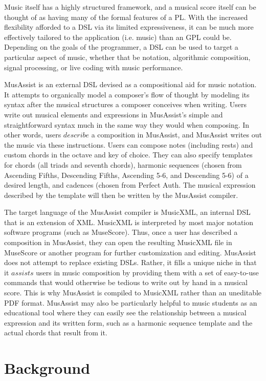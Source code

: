 \documentclass{report}
\begin{document}
Music itself has a highly structured framework, and a musical score itself can be thought of as having many of the formal features of a PL. With the increased flexibility afforded to  a DSL via its limited expressiveness, it can be much  more effectively tailored to the application (i.e. music) than an GPL could be. Depending on the goals of the programmer, a DSL can be used to target a particular aspect of music, whether that be notation, algorithmic composition, signal processing, or live coding with music performance. 

MusAssist is an external DSL devised as a compositional aid for music notation. It attempts to organically model a composer's flow of thought by modeling its syntax after the musical structures a composer conceives when writing. Users write out musical elements and expressions in MusAssist's simple and straightforward syntax much in the same way they would when composing. In other words, users $describe$ a composition in MusAssist, and MusAssist writes out the music via these instructions. Users can compose notes (including rests) and custom chords in the octave and key of choice. They can also specify templates for chords (all triads and seventh chords), harmonic sequences (chosen from Ascending Fifths, Descending Fifths, Ascending 5-6, and Descending 5-6) of a desired length, and cadences (chosen from Perfect Auth. The musical expression described by the template will then be written by the MusAssist compiler.

The target language of the MusAssist compiler is MusicXML, an internal DSL that is an extension of XML. MusicXML is interpreted by most major notation software programs (such as MuseScore). Thus, once a user has described a composition in MusAssist, they can open the resulting MusicXML file in MuseScore or another program for further customization and editing. MusAssist does not attempt to replace existing DSLs. Rather, it fills a unique niche in that it $assists$ users in music composition by providing them with a set of easy-to-use commands that would otherwise be tedious to write out by hand in a musical score. This is why MusAssist is compiled to MusicXML rather than an uneditable PDF format. MusAssist may also be particularly helpful to music students as an educational tool where they can easily see the relationship between a musical expression and its written form, such as a harmonic sequence template and the actual chords that result from it.

\chapter{Background}
\label{chap:background}
\end{document}
